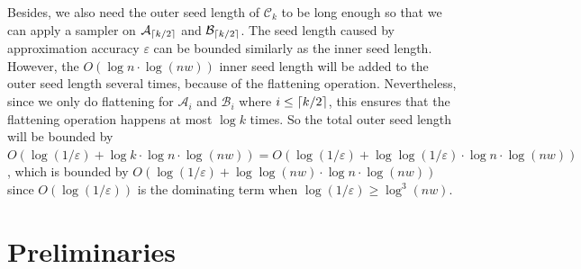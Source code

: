 \documentclass[10pt,a4paper]{article}
\DeclarePairedDelimiter\ceil{\lceil}{\rceil}
\newcommand{\cA}{\mathcal A}
\newcommand{\cB}{\mathcal B}
\newcommand{\cC}{\mathcal C}
\newcommand{\eps}{\varepsilon}
\begin{document}
Besides, we also need the outer seed length of $\cC_k$ to be long enough so that we can apply a sampler on $\cA_{\ceil{k/2}}$ and $\cB_{\ceil{k/2}}$. The seed length caused by approximation accuracy $\eps$ can be bounded similarly as the inner seed length. However, the $O(\log n\cdot \log (nw))$ inner seed length will be added to the outer seed length several times, because of the flattening operation. Nevertheless, since we only do flattening for $\cA_{i}$ and $\cB_{i}$ where $i\le \ceil{k/2}$, this ensures that the flattening operation happens at most $\log k$ times. So the total outer seed length will be bounded by $O(\log(1/\eps)+\log k\cdot \log n\cdot \log (nw))=O(\log(1/\eps)+\log \log(1/\eps)\cdot \log n\cdot \log (nw))$, which is bounded by $O(\log(1/\eps)+\log \log(nw)\cdot \log n\cdot \log (nw))$ since $O(\log(1/\eps))$ is the dominating term when $\log(1/\eps)\ge\log^3(nw)$.


\section{Preliminaries}\label{sec:prelim}
\end{document}
